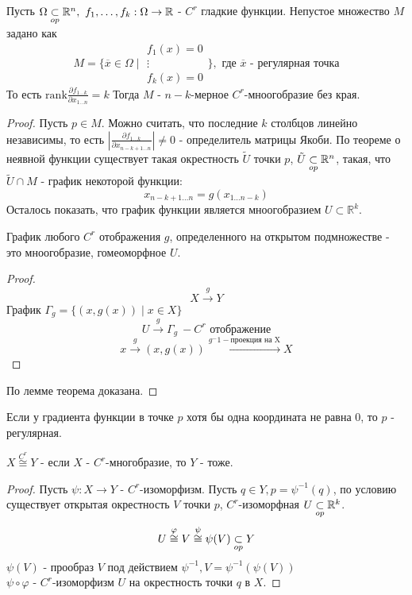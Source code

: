 \begin{theorem*}
    Пусть $\Omega \underset{op}{\subset} \mathbb{R}^n, \ f_1, \hdots, f_k: \Omega \to \mathbb{R}$ - $C^r$ гладкие функции.
    Непустое множество $M$ задано как 
    \[M = \{\overline{x} \in \Omega \mid 
    \begin{array}{c}
        f_1(x) = 0 \\
        \vdots \\
        f_k(x) = 0
    \end{array}\}, \text{ где $\overline{x}$ - регулярная точка}\]
    То есть $\mathrm{rank} \frac{\partial f_{1 \hdots k}}{\partial x_{1 \hdots n}} = k$
    Тогда $M$ - $n-k$-мерное $C^r$-мноогобразие без края.

    \begin{proof}
        Пусть $p \in M$. Можно считать, что последние $k$ столбцов линейно независимы, то есть $\left| \frac{\partial f_{1\hdots k}}{\partial x_{n-k+1 \hdots n}}\right| \neq 0$ - определитель матрицы Якоби.  
        По теореме о неявной функции существует такая окрестность $\tilde{U}$ точки $p$, $\tilde{U} \underset{op}{\subset} \mathbb{R}^n$, такая, что $\tilde{U} \cap M$ - график некоторой функции:
        \[x_{n-k+1 \hdots n} = g(x_{1 \hdots n-k})\]
        Осталось показать, что график функции является мноогобразием $U \subset \mathbb{R}^k$.
        \begin{lemma*}
            График любого $C^r$ отображения $g$, определенного на открытом подмножестве - это мноогобразие, гомеоморфное $U$.
            \begin{proof}
                \[X \overset{g}{\to} Y\]
                График $\Gamma_g = \{(x, g(x)) \mid x \in X\}$
                \[U \overset{g}{\to} \Gamma_g \ - C^r \text{ отображение}\]
                \[x \overset{g}{\to} (x, g(x)) \overset{g^-1 - \text{проекция на X}}{\to} X\]
            \end{proof}
        \end{lemma*}
        По лемме теорема доказана.
    \end{proof}
\end{theorem*}

\begin{note}
    Если у градиента функции в точке $p$ хотя бы одна координата не равна $0$, то $p$ - регулярная.
\end{note}

\begin{statement*}
    $X \overset{C^r}{\cong} Y$ - если $X$ - $C^r$-многобразие, то $Y$ - тоже.
    \begin{proof}
        Пусть $\psi: X \to Y$ - $C^r$-изоморфизм. Пусть $q\in Y, p = \psi^{-1}(q)$, по условию существует открытая
        окрестность $V$ точки $p$, $C^r$-изоморфная $U \underset{op}{\subset} \mathbb{R}^k$. 
        \[U \overset{\varphi}{\cong} V \overset{\psi}{\cong} \psi(V) \underset{op}{\subset} Y\]
        $\psi(V)$ - прообраз $V$ под действием $\psi^{-1}, V = \psi^{-1}(\psi(V))$\\
        $\psi \circ \varphi$ - $C^r$-изоморфизм $U$ на окрестность точки $q$ в $X$.
    \end{proof}
\end{statement*}

